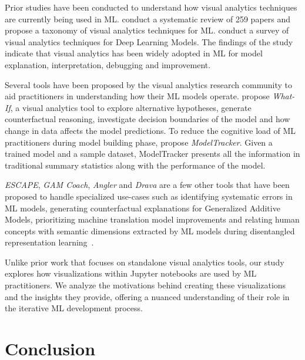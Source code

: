 \documentclass[journal]{IEEEtran}       %
\begin{document}
Prior studies have been conducted to understand how visual analytics
techniques are currently being used in ML. \cite{yuan2021survey}
conduct a systematic review of 259 papers and propose a taxonomy of
visual analytics techniques for ML. \cite{hohman2019visual} conduct a
survey of visual analytics techniques for Deep Learning Models. The
findings of the study indicate that visual analytics has been widely
adopted in ML for model explanation, interpretation, debugging and improvement.

Several tools have been proposed by the visual analytics research
community to aid practitioners in understanding how their ML models
operate. \cite{wexler2019what-if} propose \textit{What-If}, a visual
analytics tool to explore alternative hypotheses, generate
counterfactual reasoning, investigate decision boundaries of the
model and how change in data affects the model predictions. To reduce
the cognitive load of ML practitioners during model building phase,
\cite{amershi2019software} propose \textit{ModelTracker}. Given a
trained model and a sample dataset, ModelTracker presents all the
information in traditional summary statistics along with the
performance of the model.

\textit{ESCAPE}, \textit{GAM Coach}, \textit{Angler} and
\textit{Drava} are a few other tools that have been proposed to
handle specialized use-cases such as identifying systematic errors in
ML models, generating counterfactual explanations for Generalized
Additive Models, prioritizing machine translation model improvements
and relating human concepts with semantic dimensions extracted by ML
models during disentangled representation
learning~\cite{ahn2023escape,wang2023gam,robertson2023angler,wang2023drava}.

Unlike prior work that focuses on standalone visual analytics tools,
our study explores how visualizations within Jupyter notebooks are
used by ML practitioners. We analyze the motivations behind creating
these visualizations and the insights they provide, offering a
nuanced understanding of their role in the iterative ML development process.

\section{Conclusion}
\end{document}
